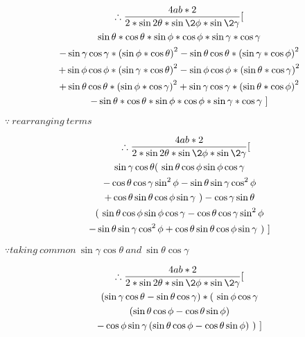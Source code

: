 \documentclass[journal,12pt,twocolumn]{IEEEtran}
\begin{document}
\vspace{0.3cm}
\begin{multline*}
        \therefore \frac{4ab*2}{2*\sin2\theta*\sin\2\phi*\sin\2\gamma}[ \\
        \sin\theta*\cos\theta*\sin\phi*\cos\phi*\sin\gamma*\cos\gamma \\-\sin\gamma\cos\gamma* \left( \sin\phi*\cos\theta \right)^2-
        \sin\theta\cos\theta* \left( \sin\gamma*\cos\phi \right)^2\\+\sin\phi\cos\phi* \left( \sin\gamma*\cos\theta \right)^2-\sin\phi\cos\phi* \left( \sin\theta*\cos\gamma \right)^2 \\+
        \sin\theta\cos\theta* \left( \sin\phi*\cos\gamma \right)^2+ \sin\gamma\cos\gamma* \left( \sin\theta*\cos\phi \right)^2\\ - \sin\theta*\cos\theta*\sin\phi*\cos\phi*\sin\gamma*\cos\gamma~
        ]
\end{multline*}
\begin{flushright}
$\because ~rearranging ~terms$
\end{flushright}
\vspace{0.3cm}
\begin{multline*}
    ~~~~\therefore \frac{4ab*2}{2*\sin2\theta*\sin\2\phi*\sin\2\gamma}
    [\\ 
    \sin\gamma\cos\theta (~ \sin\theta\cos\phi\sin\phi\cos\gamma  \\-\cos\theta\cos\gamma\sin^2\phi - \sin\theta\sin\gamma\cos^2\phi \\+
        \cos\theta\sin\theta\cos\phi\sin\gamma~ )
    -\cos\gamma\sin\theta \\( ~\sin\theta\cos\phi\sin\phi\cos\gamma - \cos\theta\cos\gamma\sin^2\phi \\ - \sin\theta\sin\gamma\cos^2\phi+ \cos\theta\sin\theta\cos\phi\sin\gamma ~)~]
\end{multline*}
\begin{flushright}
$\because taking~ common ~\sin\gamma\cos\theta ~and~ \sin\theta\cos\gamma$
\end{flushright}

\vspace{0.3cm}
\begin{multline*}
        \therefore \frac{4ab*2}{2*\sin2\theta*\sin\2\phi*\sin\2\gamma}
        [\\  (\sin\gamma\cos\theta - \sin\theta\cos\gamma)* (~ \sin\phi\cos\gamma\\ \left( \sin\theta\cos\phi -\cos\theta\sin\phi  \right)\\ - \cos\phi\sin\gamma\left( \sin\theta\cos\phi -\cos\theta\sin\phi  \right)~ )~
        ]
\end{multline*}
\end{document}
